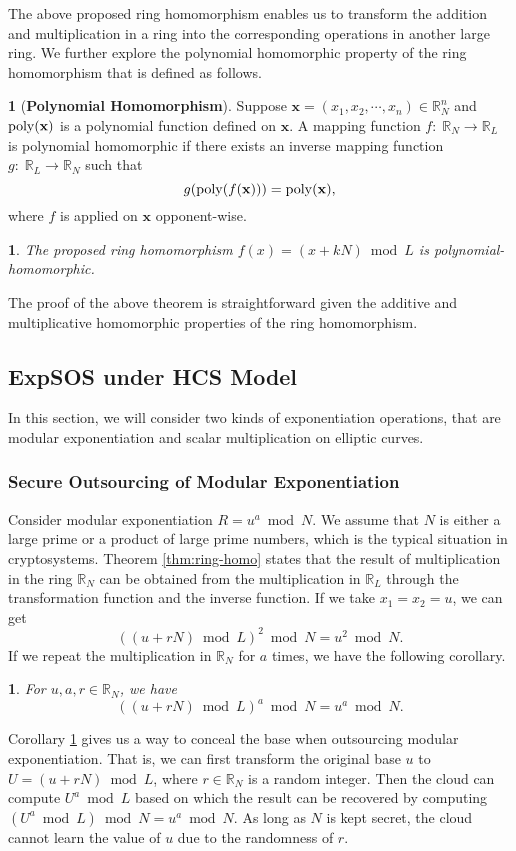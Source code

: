 \documentclass[english,draftcls,onecolumn,11pt]{IEEEtran}
\theoremstyle{definition}
\newtheorem{defn}{\protect\definitionname}
\theoremstyle{plain}
\newtheorem{thm}{\protect\theoremname}
\theoremstyle{plain}
\newtheorem{cor}{\protect\corollaryname}
\theoremstyle{definition}
\providecommand{\definitionname}{Definition}
\providecommand{\corollaryname}{Corollary}
\providecommand{\theoremname}{Theorem}
\begin{document}
The above proposed ring homomorphism enables us to transform the addition
and multiplication in a ring into the corresponding operations in
another large ring. We further explore the polynomial homomorphic
property of the ring homomorphism that is defined as follows.
\begin{defn}[\textbf{Polynomial Homomorphism}]
 Suppose $\mathbf{x}=(x_{1},x_{2},\cdots,x_{n})\in\mathbb{R}_{N}^{n}$
and ${\rm poly}(\mathbf{x})$ is a polynomial function defined on
$\mathbf{x}$. A mapping function $f:\;\mathbb{R}_{N}\longrightarrow\mathbb{R}_{L}$
is polynomial homomorphic if there exists an inverse mapping function
$g:\;\mathbb{R}_{L}\longrightarrow\mathbb{R}_{N}$ such that 
\[
g({\rm poly}(f(\mathbf{x})))={\rm poly}(\mathbf{x}),
\]
where $f$ is applied on $\mathbf{x}$ opponent-wise. \end{defn}
\begin{thm}
\label{thm:The-proposed-ring}The proposed ring homomorphism $f(x)=(x+kN)\bmod L$
is polynomial-homomorphic.
\end{thm}
The proof of the above theorem is straightforward given the additive
and multiplicative homomorphic properties of the ring homomorphism.


\subsection{ExpSOS under HCS Model}

In this section, we will consider two kinds of exponentiation operations,
that are modular exponentiation and scalar multiplication on elliptic
curves.


\subsubsection{Secure Outsourcing of Modular Exponentiation}

Consider modular exponentiation $R=u^{a}\bmod N$. We assume that
$N$ is either a large prime or a product of large prime numbers,
which is the typical situation in cryptosystems. Theorem \ref{thm:ring-homo}
states that the result of multiplication in the ring $\mathbb{R}_{N}$
can be obtained from the multiplication in $\mathbb{R}_{L}$ through
the transformation function and the inverse function. If we take $x_{1}=x_{2}=u$,
we can get
\[
((u+rN)\bmod L)^{2}\bmod N=u^{2}\bmod N.
\]
If we repeat the multiplication in $\mathbb{R}_{N}$ for $a$ times,
we have the following corollary.
\begin{cor}
\label{cor:exponentiation} For $u,a,r\in\mathbb{R}_{N}$, we have
\[
((u+rN)\bmod L)^{a}\bmod N=u^{a}\bmod N.
\]

\end{cor}
Corollary \ref{cor:exponentiation} gives us a way to conceal the
base when outsourcing modular exponentiation. That is, we can first
transform the original base $u$ to $U=(u+rN)\bmod L$, where $r\in\mathbb{R}_{N}$
is a random integer. Then the cloud can compute $U^{a}\bmod L$ based
on which the result can be recovered by computing $(U^{a}\bmod L)\bmod N=u^{a}\bmod N$.
As long as $N$ is kept secret, the cloud cannot learn the value of
$u$ due to the randomness of $r$. 
\end{document}

